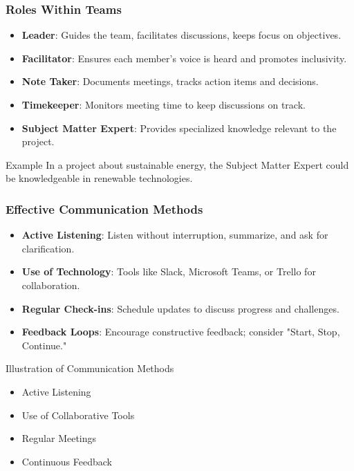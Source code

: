 \documentclass{beamer}
\begin{document}
\begin{frame}[fragile]
    \frametitle{Roles Within Teams}
    \begin{itemize}
        \item \textbf{Leader}: Guides the team, facilitates discussions, keeps focus on objectives.
        \item \textbf{Facilitator}: Ensures each member's voice is heard and promotes inclusivity.
        \item \textbf{Note Taker}: Documents meetings, tracks action items and decisions.
        \item \textbf{Timekeeper}: Monitors meeting time to keep discussions on track.
        \item \textbf{Subject Matter Expert}: Provides specialized knowledge relevant to the project.
    \end{itemize}
    \begin{block}{Example}
        In a project about sustainable energy, the Subject Matter Expert could be knowledgeable in renewable technologies.
    \end{block}
\end{frame}

\begin{frame}[fragile]
    \frametitle{Effective Communication Methods}
    \begin{itemize}
        \item \textbf{Active Listening}: Listen without interruption, summarize, and ask for clarification.
        \item \textbf{Use of Technology}: Tools like Slack, Microsoft Teams, or Trello for collaboration.
        \item \textbf{Regular Check-ins}: Schedule updates to discuss progress and challenges.
        \item \textbf{Feedback Loops}: Encourage constructive feedback; consider "Start, Stop, Continue."
    \end{itemize}
    \begin{block}{Illustration of Communication Methods}
        \begin{itemize}
            \item Active Listening
            \item Use of Collaborative Tools
            \item Regular Meetings
            \item Continuous Feedback
        \end{itemize}
    \end{block}
\end{frame}
\end{document}
